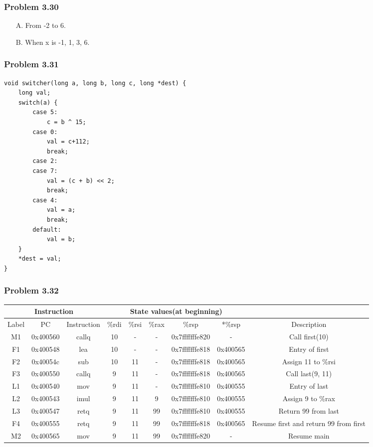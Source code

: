 \documentclass[a4paper]{article}
\begin{document}
\subsubsection*{Problem 3.30}
\begin{enumerate}
    \item [A.] From -2 to 6.
    \item [B.] When x is -1, 1, 3, 6.
\end{enumerate}

\subsubsection*{Problem 3.31}
\begin{lstlisting}
void switcher(long a, long b, long c, long *dest) {
    long val;
    switch(a) {
        case 5:
            c = b ^ 15;
        case 0:
            val = c+112;
            break;
        case 2:
        case 7:
            val = (c + b) << 2;
            break;
        case 4:
            val = a;
            break;
        default:
            val = b;
    }
    *dest = val;
}
\end{lstlisting}

\subsubsection*{Problem 3.32}
\begin{tabular}{ccc|ccccc|c}
    \hline
    \multicolumn{3}{c|}{Instruction}&\multicolumn{5}{c|}{State values(at beginning)}&\\
    \hline
    Label&PC&Instruction&\%rdi&\%rsi&\%rax&\%rsp&*\%rsp&Description\\
    \hline
    M1&0x400560&callq&10&-&-&0x7fffffffe820&-&Call first(10)\\
    F1&0x400548&lea&10&-&-&0x7fffffffe818&0x400565&Entry of first\\
    F2&0x40054c&sub&10&11&-&0x7fffffffe818&0x400565&Assign 11 to \%rsi\\
    F3&0x400550&callq&9&11&-&0x7fffffffe818&0x400565&Call last(9, 11)\\
    L1&0x400540&mov&9&11&-&0x7fffffffe810&0x400555&Entry of last\\
    L2&0x400543&imul&9&11&9&0x7fffffffe810&0x400555&Assign 9 to \%rax\\
    L3&0x400547&retq&9&11&99&0x7fffffffe810&0x400555&Return 99 from last\\
    F4&0x400555&retq&9&11&99&0x7fffffffe818&0x400565&Resume first and return 99 from first\\
    M2&0x400565&mov&9&11&99&0x7fffffffe820&-&Resume main
    
\end{tabular}
\end{document}
